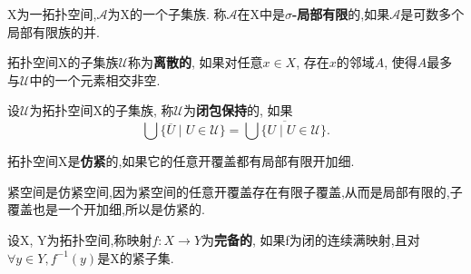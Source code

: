 \begin{definition} \label{def:sigma local finit}
  X为一拓扑空间,$\mathscr{A}$为X的一个子集族.
  称$\mathscr{A}$在X中是\textbf{$\sigma$-局部有限}的,如果$\mathscr{A}$是可数多个局部有限族的并.
\end{definition}

\begin{definition} \label{def:discrete}
  拓扑空间X的子集族$\mathscr{U}$称为\textbf{离散的}, 如果对任意$x \in X$,
  存在$x$的邻域$A$, 使得$A$最多与$\mathscr{U}$中的一个元素相交非空.
\end{definition}

\begin{definition} \label{def:closure-preserving}
  设$\mathscr{U}$为拓扑空间X的子集族, 称$\mathscr{U}$为\textbf{闭包保持}的, 如果
  \[
    \bigcup \{ \overline{U} \mid U \in \mathscr{U} \}
    = \overline{\bigcup \{ U \mid U \in \mathscr{U} \}}.
  \]
\end{definition}

\begin{definition} \label{def:paracompact}
  拓扑空间X是\textbf{仿紧}的,如果它的任意开覆盖都有局部有限开加细.
\end{definition}
紧空间是仿紧空间,因为紧空间的任意开覆盖存在有限子覆盖,从而是局部有限的,子覆盖也是一个开加细,所以是仿紧的.

\begin{definition}
  设X, Y为拓扑空间,称映射$f : X \longrightarrow Y$为\textbf{完备的},
  如果f为闭的连续满映射,且对$\forall y \in Y, f^{-1}(y)$是X的紧子集.
\end{definition}
